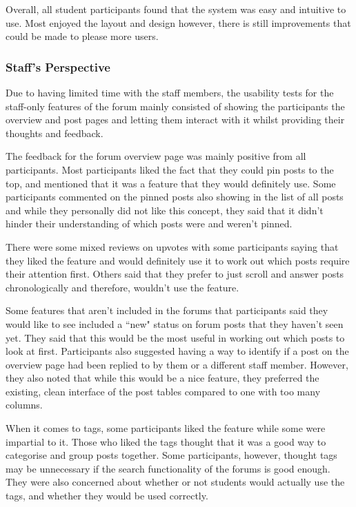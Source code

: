 Overall, all student participants found that the system was easy and intuitive to use.
Most enjoyed the layout and design however, there is still improvements that could be made to please more users.

\subsubsection{Staff's Perspective}

Due to having limited time with the staff members, the usability tests for the staff-only features of the forum mainly consisted of showing the participants the overview and post pages and letting them interact with it whilst providing their thoughts and feedback.

The feedback for the forum overview page was mainly positive from all participants.
Most participants liked the fact that they could pin posts to the top, and mentioned that it was a feature that they would definitely use.
Some participants commented on the pinned posts also showing in the list of all posts and while they personally did not like this concept, they said that it didn't hinder their understanding of which posts were and weren't pinned.

There were some mixed reviews on upvotes with some participants saying that they liked the feature and would definitely use it to work out which posts require their attention first.
Others said that they prefer to just scroll and answer posts chronologically and therefore, wouldn't use the feature.

Some features that aren't included in the forums that participants said they would like to see included a ``new" status on forum posts that they haven't seen yet.
They said that this would be the most useful in working out which posts to look at first.
Participants also suggested having a way to identify if a post on the overview page had been replied to by them or a different staff member.
However, they also noted that while this would be a nice feature, they preferred the existing, clean interface of the post tables compared to one with too many columns.

When it comes to tags, some participants liked the feature while some were impartial to it.
Those who liked the tags thought that it was a good way to categorise and group posts together.
Some participants, however, thought tags may be unnecessary if the search functionality of the forums is good enough.
They were also concerned about whether or not students would actually use the tags, and whether they would be used correctly.

